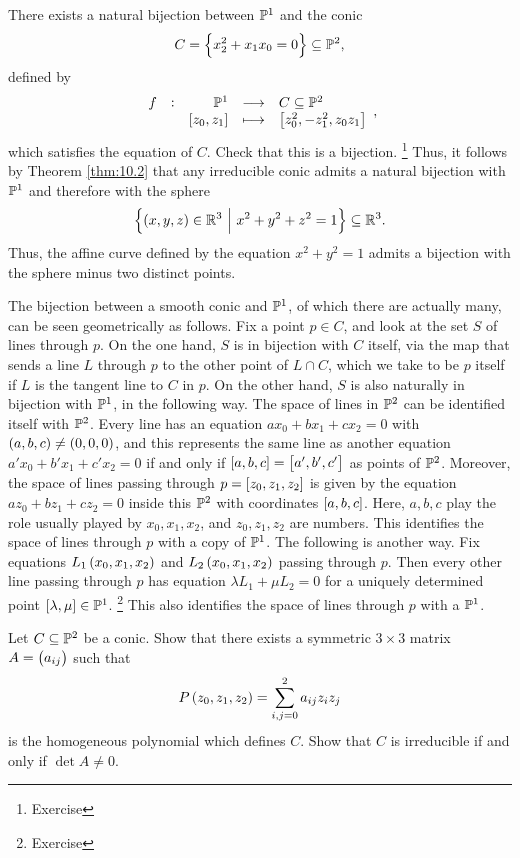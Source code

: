 \begin{remark}
There exists a natural bijection between $ \mathbb{P}^1 $ and the conic
$$ C = \cbr{x_2^2 + x_1x_0 = 0} \subseteq \PP^2, $$
defined by
$$ \function[f]{\PP^1}{C \subseteq \PP^2}{\sbr{z_0, z_1}}{\sbr{z_0^2, -z_1^2, z_0z_1}}, $$
which satisfies the equation of $ C $. Check that this is a bijection. \footnote{Exercise} Thus, it follows by Theorem \ref{thm:10.2} that any irreducible conic admits a natural bijection with $ \mathbb{P}^1 $ and therefore with the sphere
$$ \cbr{\br{x, y, z} \in \RR^3 \st x^2 + y^2 + z^2 = 1} \subseteq \RR^3. $$
Thus, the affine curve defined by the equation $ x^2 + y^2 = 1 $ admits a bijection with the sphere minus two distinct points.
\end{remark}

\begin{remark}
The bijection between a smooth conic and $ \mathbb{P}^1 $, of which there are actually many, can be seen geometrically as follows. Fix a point $ p \in C $, and look at the set $ S $ of lines through $ p $. On the one hand, $ S $ is in bijection with $ C $ itself, via the map that sends a line $ L $ through $ p $ to the other point of $ L \cap C $, which we take to be $ p $ itself if $ L $ is the tangent line to $ C $ in $ p $. On the other hand, $ S $ is also naturally in bijection with $ \mathbb{P}^1 $, in the following way. The space of lines in $ \mathbb{P}^2 $ can be identified itself with $ \mathbb{P}^2 $. Every line has an equation $ ax_0 + bx_1 + cx_2 = 0 $ with $ \br{a, b, c} \ne \br{0, 0, 0} $, and this represents the same line as another equation $ a'x_0 + b'x_1 + c'x_2 = 0 $ if and only if $ \sbr{a, b, c} = \sbr{a', b', c'} $ as points of $ \mathbb{P}^2 $. Moreover, the space of lines passing through $ p = \sbr{z_0, z_1, z_2} $ is given by the equation $ az_0 + bz_1 + cz_2 = 0 $ inside this $ \mathbb{P}^2 $ with coordinates $ \sbr{a, b, c} $. Here, $ a, b, c $ play the role usually played by $ x_0, x_1, x_2 $, and $ z_0, z_1, z_2 $ are numbers. This identifies the space of lines through $ p $ with a copy of $ \mathbb{P}^1 $. The following is another way. Fix equations $ L_1\br{x_0, x_1, x_2} $ and $ L_2\br{x_0, x_1, x_2} $ passing through $ p $. Then every other line passing through $ p $ has equation $ \lambda L_1 + \mu L_2 = 0 $ for a uniquely determined point $ \sbr{\lambda, \mu} \in \PP^1 $. \footnote{Exercise} This also identifies the space of lines through $ p $ with a $ \mathbb{P}^1 $.
\end{remark}

\begin{exercise**}
\label{ex:31}
Let $ C \subseteq \mathbb{P}^2 $ be a conic. Show that there exists a symmetric $ 3 \times 3 $ matrix $ A = \br{a_{ij}} $ such that
$$ P\br{z_0, z_1, z_2} = \sum_{i, j = 0}^2 a_{ij}z_iz_j $$
is the homogeneous polynomial which defines $ C $. Show that $ C $ is irreducible if and only if $ \det A \ne 0 $.
\end{exercise**}

